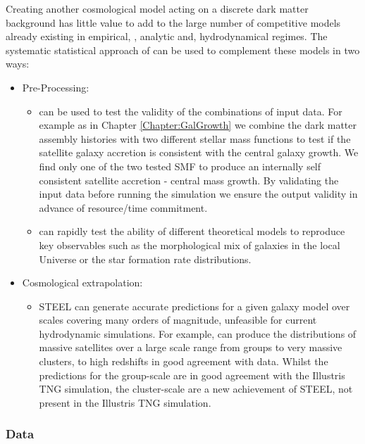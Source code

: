 Creating another cosmological model acting on a discrete dark matter background has little value to add to the large number of competitive models already existing in empirical, \cite[e.g.][]{Rodriguez-Puebla2017ConstrainingProperties, Moster2018Emerge10, Behroozi2019UniverseMachine:010, Zavala2012}, analytic \cite[e.g.][]{Somerville2015StarGas, Guo2011FromCosmology, Fontanot2007ReproducingCosmogony, Zoldan2019TheEvolution} and, hydrodynamical \cite{Springel2018FirstClustering, Hopkins2018FIRE-2Formation, McAlpine2015TheCatalogues} regimes. The systematic statistical approach of \steel can be used to complement these models in two ways:
\begin{itemize}
    \item Pre-Processing: 
    \begin{itemize}
        \item \steel can be used to test the validity of the combinations of input data. For example as in Chapter \ref{Chapter:GalGrowth} we combine the dark matter assembly histories with two different stellar mass functions to test if the satellite galaxy accretion is consistent with the central galaxy growth. We find only one of the two tested SMF to produce an internally self consistent satellite accretion - central mass growth. By validating the input data before running the simulation we ensure the output validity in advance of resource/time commitment.
        \item \steel can rapidly test the ability of different theoretical models to reproduce key observables such as the morphological mix of galaxies in the local Universe or the star formation rate distributions. 
    \end{itemize}
    \item Cosmological extrapolation: 
    \begin{itemize}
        \item STEEL can generate accurate predictions for a given galaxy model over scales covering many orders of magnitude, unfeasible for current hydrodynamic simulations. For example, \steel can produce the distributions of massive satellites over a large scale range from groups to very massive clusters, to high redshifts in good agreement with data. Whilst the predictions for the group-scale are in good agreement with the Illustris TNG simulation, the cluster-scale are a new achievement of STEEL, not present in the Illustris TNG simulation.
    \end{itemize}
\end{itemize}
\subsubsection{Data}

